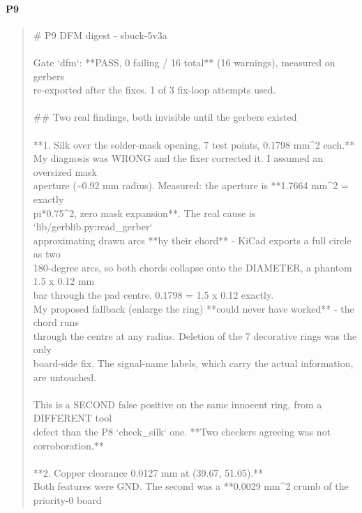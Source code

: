\documentclass[11pt,a4paper]{article}
\begin{document}
\paragraph*{P9}
\begin{quote}\small\ttfamily\raggedright
\# P9 DFM digest - sbuck-5v3a\\
~\\
Gate `dfm`: {*}{*}PASS, 0 failing / 16 total{*}{*} (16 warnings), measured on gerbers\\
re-exported after the fixes. 1 of 3 fix-loop attempts used.\\
~\\
\#\# Two real findings, both invisible until the gerbers existed\\
~\\
{*}{*}1. Silk over the solder-mask opening, 7 test points, 0.1798 mm\textasciicircum{}2 each.{*}{*}\\
My diagnosis was WRONG and the fixer corrected it. I assumed an oversized mask\\
aperture (\textasciitilde{}0.92 mm radius). Measured: the aperture is {*}{*}1.7664 mm\textasciicircum{}2 = exactly\\
pi{*}0.75\textasciicircum{}2, zero mask expansion{*}{*}. The real cause is `lib/gerblib.py:read\_gerber`\\
approximating drawn arcs {*}{*}by their chord{*}{*} - KiCad exports a full circle as two\\
180-degree arcs, so both chords collapse onto the DIAMETER, a phantom 1.5 x 0.12 mm\\
bar through the pad centre. 0.1798 = 1.5 x 0.12 exactly.\\
My proposed fallback (enlarge the ring) {*}{*}could never have worked{*}{*} - the chord runs\\
through the centre at any radius. Deletion of the 7 decorative rings was the only\\
board-side fix. The signal-name labels, which carry the actual information, are untouched.\\
~\\
This is a SECOND false positive on the same innocent ring, from a DIFFERENT tool\\
defect than the P8 `check\_silk` one. {*}{*}Two checkers agreeing was not corroboration.{*}{*}\\
~\\
{*}{*}2. Copper clearance 0.0127 mm at (39.67, 51.05).{*}{*}\\
Both features were GND. The second was a {*}{*}0.0029 mm\textasciicircum{}2 crumb of the priority-0 board\\

\end{quote}
\end{document}
